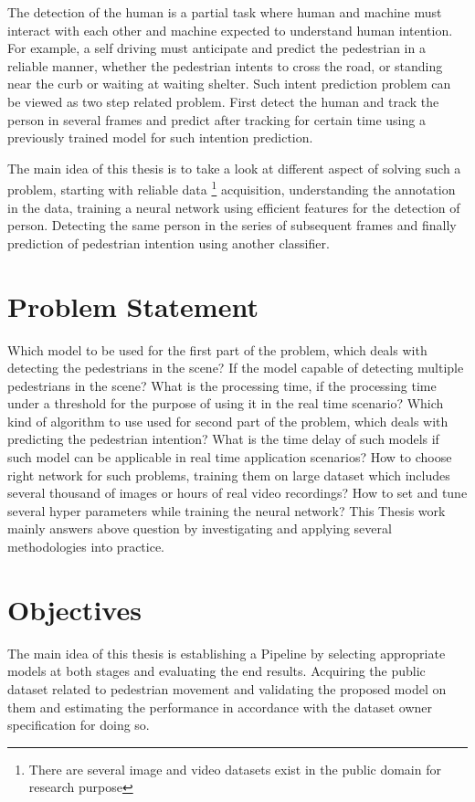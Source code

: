 \vspace{1em}
\noindent The detection of the human is a partial task where human and machine must interact 
with each other and machine expected to understand human intention. For example, 
a self driving must anticipate and predict the pedestrian in a reliable manner, whether 
the pedestrian intents to cross the road, or standing near the curb or waiting at waiting shelter.
Such intent prediction problem can be viewed as two step related problem. First detect the 
human and track the person in several frames and predict after tracking for certain time using a 
previously trained model for such intention prediction.

\vspace{1em}
\noindent The main idea of this thesis is to take a look at different aspect of solving such a problem, 
starting with reliable data \footnote{There are several image and video datasets exist in the 
public domain for research purpose} acquisition, understanding the annotation in the data, 
training a neural network using efficient features for the detection of person. Detecting the same person in the series of subsequent frames and finally prediction of pedestrian intention using another classifier.

\section{Problem Statement} 
Which model to be used for the first part of the problem, which deals with detecting the pedestrians in the scene? If the model capable of detecting multiple pedestrians in the scene? What is the processing time, if the processing time under a threshold for the purpose of using it in the real time scenario?
Which kind of algorithm to use used for second part of the problem, which deals with predicting the pedestrian intention? What is the time delay of such models if such model can be applicable in real time application scenarios?
How to choose right network for such problems, training them on large dataset which includes several thousand of images or hours of real video recordings? How to set and tune several hyper parameters while training the neural network? This Thesis work mainly answers above question by investigating and  applying several methodologies into practice.

\section{Objectives}
The main idea of this thesis is establishing a Pipeline by selecting appropriate models at both stages and evaluating the end results. Acquiring the public dataset related to pedestrian movement and validating the proposed model on them and estimating the performance in accordance with the dataset owner specification for doing so.

